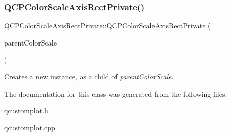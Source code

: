 \subsubsection{\texorpdfstring{Q\+C\+P\+Color\+Scale\+Axis\+Rect\+Private()}{QCPColorScaleAxisRectPrivate()}}
{\footnotesize\ttfamily Q\+C\+P\+Color\+Scale\+Axis\+Rect\+Private\+::\+Q\+C\+P\+Color\+Scale\+Axis\+Rect\+Private (\begin{DoxyParamCaption}\item[{\hyperlink{classQCPColorScale}{Q\+C\+P\+Color\+Scale} $\ast$}]{parent\+Color\+Scale }\end{DoxyParamCaption})\hspace{0.3cm}{\ttfamily [explicit]}}

Creates a new instance, as a child of {\itshape parent\+Color\+Scale}. 

The documentation for this class was generated from the following files\+:\begin{DoxyCompactItemize}
\item 
qcustomplot.\+h\item 
qcustomplot.\+cpp\end{DoxyCompactItemize}
